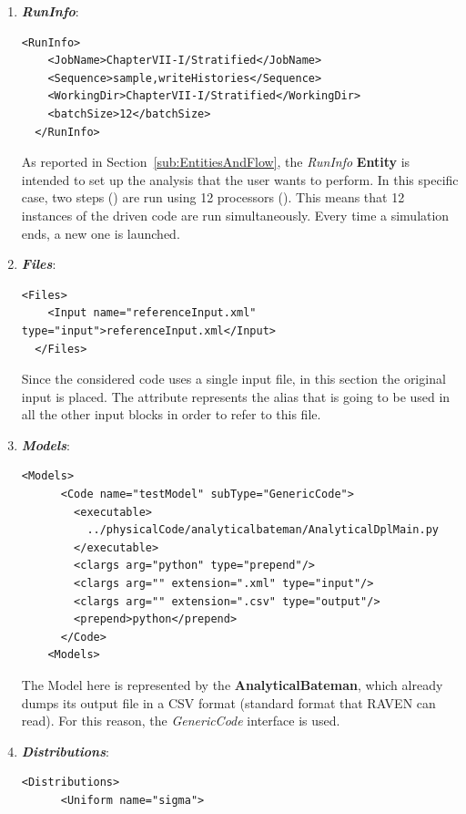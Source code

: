 \begin{enumerate}
   \item \textbf{\textit{RunInfo}}:
\begin{lstlisting}[style=XML,morekeywords={arg,extension,pauseAtEnd,overwrite}]
  <RunInfo>
    <JobName>ChapterVII-I/Stratified</JobName>
    <Sequence>sample,writeHistories</Sequence>
    <WorkingDir>ChapterVII-I/Stratified</WorkingDir>
    <batchSize>12</batchSize>
  </RunInfo>
\end{lstlisting}   
   As reported in Section~\ref{sub:EntitiesAndFlow}, the \textit{RunInfo} \textbf{Entity} is intended to set up the analysis 
   that the user wants to perform. In this specific case, two steps () are  run 
   using 12 processors (). This means that
   12 instances of the driven code are run simultaneously. 
   Every time a simulation ends, a new one is launched.
   \item \textbf{\textit{Files}}:
\begin{lstlisting}[style=XML,morekeywords={arg,extension,pauseAtEnd,overwrite}]
  <Files>
    <Input name="referenceInput.xml" type="input">referenceInput.xml</Input>
  </Files>
\end{lstlisting}
   Since the considered code uses a single input file, in this section the original input is placed. 
   The attribute   represents the alias that is going to be used in all the other input blocks in order to refer to this file.
   \item \textbf{\textit{Models}}:
\begin{lstlisting}[style=XML,morekeywords={arg,extension,pauseAtEnd,overwrite}]
   <Models>
      <Code name="testModel" subType="GenericCode">
        <executable>
          ../physicalCode/analyticalbateman/AnalyticalDplMain.py
        </executable>
        <clargs arg="python" type="prepend"/>
        <clargs arg="" extension=".xml" type="input"/>
        <clargs arg="" extension=".csv" type="output"/>
        <prepend>python</prepend>
      </Code>
    <Models>
\end{lstlisting}
 The Model here is represented by the 
 \textbf{AnalyticalBateman}, which already dumps its output file in a 
 CSV format (standard format that RAVEN can read). For this reason,
 the \textit{GenericCode} interface is used.
   \item \textbf{\textit{Distributions}}:
\begin{lstlisting}[style=XML,morekeywords={arg,extension,pauseAtEnd,overwrite}]
  <Distributions>
      <Uniform name="sigma">

\end{lstlisting}
\end{enumerate}
